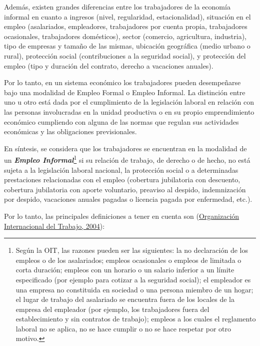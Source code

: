 \documentclass[
  openany]{book}
\begin{document}
Además, existen grandes diferencias entre los trabajadores de la economía informal en cuanto a ingresos (nivel, regularidad, estacionalidad), situación en el empleo (asalariados, empleadores, trabajadores por cuenta propia, trabajadores ocasionales, trabajadores domésticos), sector (comercio, agricultura, industria), tipo de empresas y tamaño de las mismas, ubicación geográfica (medio urbano o rural), protección social (contribuciones a la seguridad social), y protección del empleo (tipo y duración del contrato, derecho a vacaciones anuales).

Por lo tanto, en un sistema económico los trabajadores pueden desempeñarse bajo una modalidad de Empleo Formal o Empleo Informal. La distinción entre uno u otro está dada por el cumplimiento de la legislación laboral en relación con las personas involucradas en la unidad productiva o en su propio emprendimiento económico cumpliendo con alguna de las normas que regulan sus actividades económicas y las obligaciones previsionales.

En síntesis, se considera que los trabajadores se encuentran en la modalidad de un \textbf{\emph{Empleo Informal}}\footnote{Según la OIT, las razones pueden ser las siguientes: la no declaración de los empleos o de los asalariados; empleos ocasionales o empleos de limitada o corta duración; empleos con un horario o un salario inferior a un límite especificado (por ejemplo para cotizar a la seguridad social); el empleador es una empresa no constituida en sociedad o una persona miembro de un hogar; el lugar de trabajo del asalariado se encuentra fuera de los locales de la empresa del empleador (por ejemplo, los trabajadores fuera del establecimiento y sin contratos de trabajo); empleos a los cuales el reglamento laboral no se aplica, no se hace cumplir o no se hace respetar por otro motivo.} si su relación de trabajo, de derecho o de hecho, no está sujeta a la legislación laboral nacional, la protección social o a determinadas prestaciones relacionadas con el empleo (cobertura jubilatoria con descuento, cobertura jubilatoria con aporte voluntario, preaviso al despido, indemnización por despido, vacaciones anuales pagadas o licencia pagada por enfermedad, etc.).

Por lo tanto, las principales definiciones a tener en cuenta son (\protect\hyperlink{ref-oit2004}{Organización Internacional del Trabajo, 2004}):
\end{document}
